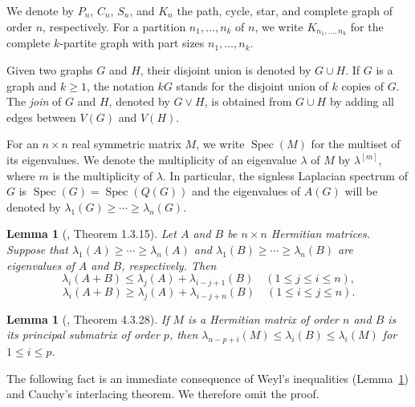 \documentclass[preprint,12pt]{elsarticle}
\newtheorem{lemma}[theorem]{Lemma}
\begin{document}
We denote by $P_n$, $C_n$, $S_n$, and $K_n$ the path, cycle, star, and complete graph
of order $n$, respectively. For a partition $n_1,\dots,n_k$ of $n$, we write
$K_{n_1,\dots,n_k}$ for the complete $k$-partite graph with part sizes $n_1,\dots,n_k$.

Given two graphs $G$ and $H$, their disjoint union is denoted by $G \cup H$.
If $G$ is a graph and $k \ge 1$, the notation $kG$ stands for the disjoint union of $k$ copies of $G$.
The \emph{join} of $G$ and $H$, denoted by $G \vee H$, is obtained from $G \cup H$ by adding all edges between $V(G)$ and $V(H)$.

For an $n \times n$ real symmetric matrix $M$, we write $ \operatorname{Spec}(M)$ for the multiset of its eigenvalues. We denote the multiplicity of an eigenvalue $\lambda$ of $M$ by ${\lambda ^{\left[ {{m}} \right]}}$, where $m$ is the multiplicity of $\lambda $.
In particular, the signless Laplacian spectrum of $G$ is
$ \operatorname{Spec}(G) = \operatorname{Spec}(Q(G))$ and the eigenvalues of \(A(G)\) will be denoted by
\(\lambda_1(G) \geq \cdots \geq \lambda_n(G)\). %




\begin{lemma}[\cite{Cvetkovic2010}, Theorem 1.3.15] \label{lema:Weyl}
Let \( A \) and \( B \) be \( n \times n \) Hermitian matrices. Suppose that \( \lambda_1(A) \geq \cdots \geq \lambda_n(A) \) and \( \lambda_1(B) \geq \cdots \geq \lambda_n(B) \) are eigenvalues of \( A \) and \( B \), respectively. Then
\[
\lambda_i (A + B) \leq \lambda_j (A) + \lambda_{i-j+1} (B) \quad (1 \leq j \leq i \leq n),
\]
\[
\lambda_i (A + B) \geq \lambda_j (A) + \lambda_{i-j+n} (B) \quad (1 \leq i \leq j \leq n).
\]
\end{lemma}

\begin{lemma}[\cite{Horn2012}, Theorem 4.3.28]\label{lema: principal submatrix}
If $M$ is a Hermitian matrix of order $n$ and $B$ is its principal submatrix of order $p$, then $\lambda_{n-p+i}(M) \leq \lambda_i(B) \leq \lambda_i(M) $ for $1 \leq i \leq p$.
\end{lemma}
The following fact is an immediate consequence of Weyl’s inequalities (Lemma~\ref{lema:Weyl}) and Cauchy’s interlacing theorem. We therefore omit the proof.
\end{document}
